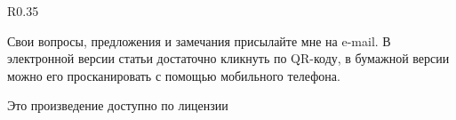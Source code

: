 \documentclass{artikel1}
\begin{document}
\begin{wrapfigure}[5]{R}{0.35\linewidth}
	\vspace{-7ex}
\end{wrapfigure}

Свои вопросы, предложения и замечания присылайте мне на e-mail. В электронной версии статьи достаточно кликнуть по QR-коду, в бумажной версии можно его просканировать с помощью мобильного телефона.

\vfill

\begin{center}
	Это произведение доступно по лицензии \doclicenseNameRef \\ \doclicenseImage[imagewidth=5em]
\end{center}
\end{document}
